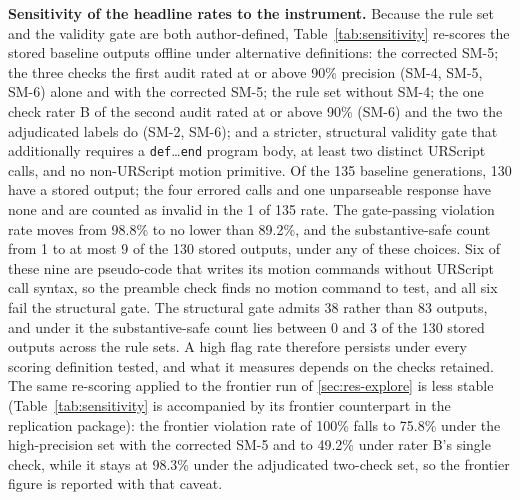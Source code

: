 \documentclass{ieeeaccess}
\begin{document}
\textbf{Sensitivity of the headline rates to the instrument.} Because the rule set and the
validity gate are both author-defined, Table~\ref{tab:sensitivity} re-scores the stored
baseline outputs offline under alternative definitions: the corrected SM-5; the three
checks the first audit rated at or above 90\% precision (SM-4, SM-5, SM-6) alone and with
the corrected SM-5; the rule set without SM-4; the one check rater B of the second audit
rated at or above 90\% (SM-6) and the two the adjudicated labels do (SM-2, SM-6); and a
stricter, structural validity gate that additionally requires a
\texttt{def}\ldots\texttt{end} program body, at least two distinct URScript calls, and no
non-URScript motion primitive. Of the 135 baseline generations, 130 have a stored
output; the four errored calls and one unparseable response have none and are counted
as invalid in the 1 of 135 rate. The gate-passing violation rate moves from 98.8\% to no
lower than 89.2\%, and the substantive-safe count from 1 to at most 9 of the 130 stored
outputs, under any of these choices. Six of these nine are pseudo-code that writes its
motion commands without URScript call syntax, so the preamble check finds no motion
command to test, and all six fail the structural gate. The structural gate admits 38
rather than 83 outputs, and under it the substantive-safe count lies between 0 and 3 of
the 130 stored outputs across the rule sets. A high flag rate therefore persists under
every scoring definition tested, and what it measures depends on the checks retained. The same re-scoring applied to the
frontier run of \ref{sec:res-explore} is less stable (Table~\ref{tab:sensitivity} is
accompanied by its frontier counterpart in the replication package): the frontier
violation rate of 100\% falls to 75.8\% under the high-precision set with the corrected
SM-5 and to 49.2\% under rater B's single check, while it stays at 98.3\% under the
adjudicated two-check set, so the frontier figure is reported with that caveat.
\end{document}
